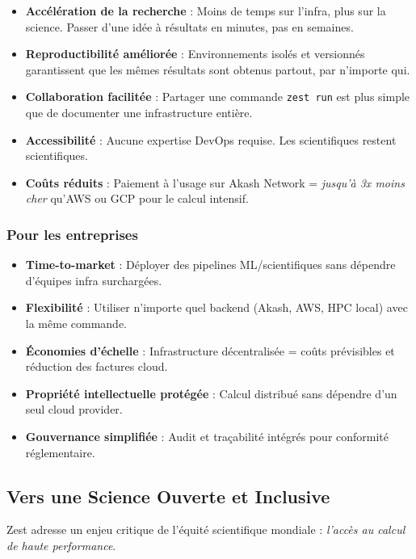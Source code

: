 \documentclass[11pt,a4paper]{article}
\begin{document}
	\begin{itemize}
		\item \textbf{Accélération de la recherche} : Moins de temps sur l'infra, plus sur la science. Passer d'une idée à résultats en minutes, pas en semaines.
		\item \textbf{Reproductibilité améliorée} : Environnements isolés et versionnés garantissent que les mêmes résultats sont obtenus partout, par n'importe qui.
		\item \textbf{Collaboration facilitée} : Partager une commande \texttt{zest run} est plus simple que de documenter une infrastructure entière.
		\item \textbf{Accessibilité} : Aucune expertise DevOps requise. Les scientifiques restent scientifiques.
		\item \textbf{Coûts réduits} : Paiement à l'usage sur Akash Network = \textit{jusqu'à 3x moins cher} qu'AWS ou GCP pour le calcul intensif.
	\end{itemize}
	
	\subsubsection{Pour les entreprises}
	
	\begin{itemize}
		\item \textbf{Time-to-market} : Déployer des pipelines ML/scientifiques sans dépendre d'équipes infra surchargées.
		\item \textbf{Flexibilité} : Utiliser n'importe quel backend (Akash, AWS, HPC local) avec la même commande.
		\item \textbf{Économies d'échelle} : Infrastructure décentralisée = coûts prévisibles et réduction des factures cloud.
		\item \textbf{Propriété intellectuelle protégée} : Calcul distribué sans dépendre d'un seul cloud provider.
		\item \textbf{Gouvernance simplifiée} : Audit et traçabilité intégrés pour conformité réglementaire.
	\end{itemize}
	
	\subsection{Vers une Science Ouverte et Inclusive}
	
	Zest adresse un enjeu critique de l'équité scientifique mondiale : \textit{l'accès au calcul de haute performance}.
	
\end{document}
